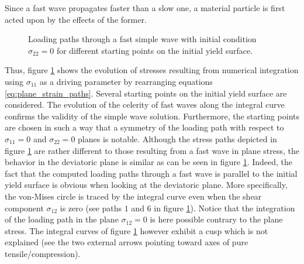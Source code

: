 Since a fast wave propagates faster than a slow one, a material particle is first acted upon by the effects of the former. 
\begin{figure}[h!]
  \centering
  \caption{Loading paths through a fast simple wave with initial condition $\sigma_{22}=0$ for different starting points on the initial yield surface.}
  \label{fig:fast_path_plane_strains}
\end{figure}
Thus, figure \ref{fig:fast_path_plane_strains} shows the evolution of stresses resulting from numerical integration using $\sigma_{11}$ as a driving parameter by rearranging equations \eqref{eq:plane_strain_paths}.
Several starting points on the initial yield surface are considered.
The evolution of the celerity of fast waves along the integral curve confirms the validity of the simple wave solution.
Furthermore, the starting points are chosen in such a way that a symmetry of the loading path with respect to $\sigma_{11}=0$ and $\sigma_{22}=0$ planes is notable.
Although the stress paths depicted in figure \ref{fig:fast_path_plane_strains} are rather different to those resulting from a fast wave in plane stress, the behavior in the deviatoric plane is similar as can be seen in figure \ref{fig:fast_path_plane_strains}. 
Indeed, the fact that the computed loading paths through a fast wave is parallel to the initial yield surface is obvious when looking at the deviatoric plane.
More specifically, the von-Mises circle is traced by the integral curve even when the shear component $\sigma_{12}$ is zero (see paths $1$ and $6$ in figure \ref{fig:fast_path_plane_strains}).
Notice that the integration of the loading path in the plane $\sigma_{12}=0$ is here possible contrary to the plane stress.
The integral curves of figure \ref{fig:fast_path_plane_strains} however exhibit a cusp which is not explained (see the two external arrows pointing toward axes of pure tensile/compression).


